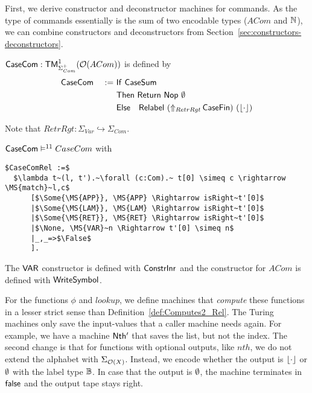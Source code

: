 First, we derive constructor and deconstructor machines for commands.  As the type of commands essentially is the sum of two encodable types ($ACom$
and $\Nat$), we can combine constructors and deconstructors from Section~\ref{sec:constructors-deconstructors}.
%
\begin{definition}[$\MS{CaseCom}$][CaseTok]
  $\MS{CaseCom} : \TM_{\Sigma^+_{Com}}^1(\Option(ACom))$ is defined by
  \begin{alignat*}{2}
    & \MS{CaseCom} &~:=~& \MS{If}~\MS{CaseSum} \\
    &               &    & \MS{Then}~   \Return{\Nop}{\None} \\
    &               &    & \MS{Else}~~~ \MS{Relabel}~(\LiftAlphabet{\MS{CaseFin}}{RetrRgt})~(\Some\cdot)
  \end{alignat*}
\end{definition}
Note that $RetrRgt : \Sigma_{Var} \hookrightarrow \Sigma_{Com}$.
\begin{lemma}
  \label{lem:CaseCom_Sem}
  $\MS{CaseCom} \RealiseIn{11} CaseCom$ with
\begin{lstlisting}[style=semicoqstyle]
$CaseComRel :=$
  $\lambda t~(l, t').~\forall (c:Com).~ t[0] \simeq c \rightarrow \MS{match}~l,c$
      [$\Some{\MS{APP}}, \MS{APP} \Rightarrow isRight~t'[0]$
      |$\Some{\MS{LAM}}, \MS{LAM} \Rightarrow isRight~t'[0]$
      |$\Some{\MS{RET}}, \MS{RET} \Rightarrow isRight~t'[0]$
      |$\None, \MS{VAR}~n \Rightarrow t'[0] \simeq n$
      |_,_=>$\False$
      ].
\end{lstlisting}
\end{lemma}
The $\MS{VAR}$ constructor is defined with $\MS{ConstrInr}$ and the constructor for $ACom$ is defined with $\MS{WriteSymbol}$.

For the functions $\phi$ and $lookup$, we define machines that \textit{compute} these functions in a lesser strict sense than
Definition~\ref{def:Computes2_Rel}.  The Turing machines only save the input-values that a caller machine needs again.  For example, we have a machine
$\MS{Nth'}$ that saves the list, but not the index.  The second change is that for functions with optional outputs, like $nth$, we do not extend the
alphabet with $\Sigma_{\Option(X)}$.  Instead, we encode whether the output is $\Some{\cdot}$ or $\None$ with the label type $\Bool$.  In case that
the output is $\None$, the machine terminates in $\false$ and the output tape stays right.

